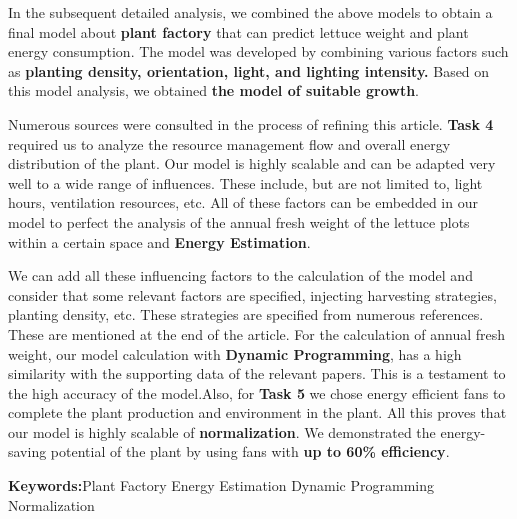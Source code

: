 \documentclass[12pt]{article}
\begin{document}
In the subsequent detailed analysis, we combined the above models to obtain a final model about \textbf{plant factory} that can predict lettuce weight and plant energy consumption. The model was developed by combining various factors such as \textbf{planting density, orientation, light, and lighting intensity.} Based on this model analysis, we obtained \textbf{the model of suitable growth}.

Numerous sources were consulted in the process of refining this article. \textbf{Task 4} required us to analyze the resource management flow and overall energy distribution of the plant. Our model is highly scalable and can be adapted very well to a wide range of influences. These include, but are not limited to, light hours, ventilation resources, etc. All of these factors can be embedded in our model to perfect the analysis of the annual fresh weight of the lettuce plots within a certain space and \textbf{Energy Estimation}. 


We can add all these influencing factors to the calculation of the model and consider that some relevant factors are specified, injecting harvesting strategies, planting density, etc. These strategies are specified from numerous references. These are mentioned at the end of the article. For the calculation of annual fresh weight, our model calculation with \textbf{Dynamic Programming}, has a high similarity with the supporting data of the relevant papers. This is a testament to the high accuracy of the model.Also, for \textbf{Task 5} we chose energy efficient fans to complete the plant production and environment in the plant. All this proves that our model is highly scalable of \textbf{normalization}. We demonstrated the energy-saving potential of the plant by using fans with \textbf{up to 60\% efficiency}.


\vspace{0.4cm}
\noindent \textbf{Keywords:}\quad Plant Factory \quad Energy Estimation \quad Dynamic Programming \quad Normalization

\clearpage
\pagestyle{fancy}
\newpage
\setcounter{page}{1}
\tableofcontents



\newpage







\end{document}
